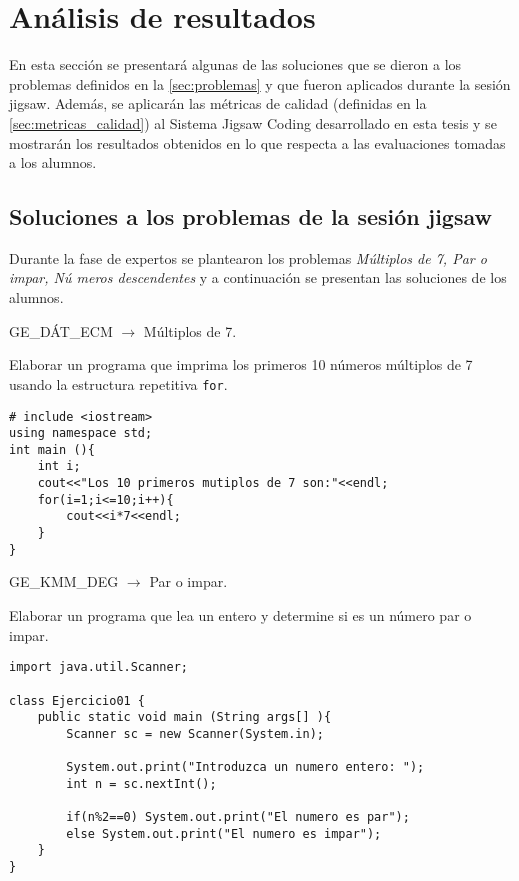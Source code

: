 \chapter{Análisis de resultados}
\label{cap:analisis_de_resultados}
En esta sección se presentará algunas de las soluciones que se dieron a los problemas definidos en la \autoref{sec:problemas} y que fueron aplicados durante la sesión jigsaw. Además, se aplicarán las métricas de calidad (definidas en la \autoref{sec:metricas_calidad}) al Sistema Jigsaw Coding desarrollado en esta tesis y se mostrarán los resultados obtenidos en lo que respecta a las evaluaciones tomadas a los alumnos.\\

\section{Soluciones a los problemas de la sesión jigsaw}
Durante la fase de expertos se plantearon los problemas \emph{Múltiplos de 7, Par o impar, Nú meros descendentes} y a continuación se presentan las soluciones de los alumnos.

\begin{center}
	GE\_DÁT\_ECM $\longrightarrow$ Múltiplos de 7.
\end{center}

Elaborar un programa que imprima los primeros 10 números múltiplos de 7 usando la estructura repetitiva \texttt{for}.

\lstset{language=C, breaklines=true, basicstyle=\footnotesize}
\begin{lstlisting}
# include <iostream>
using namespace std;
int main (){
	int i;
	cout<<"Los 10 primeros mutiplos de 7 son:"<<endl;
	for(i=1;i<=10;i++){
		cout<<i*7<<endl;
	}
}
\end{lstlisting}
\clearpage
\begin{center}
	GE\_KMM\_DEG $\longrightarrow$ Par o impar.
\end{center}

Elaborar un programa que lea un entero y determine si es un número par o impar.

\lstset{language=Java, breaklines=true, basicstyle=\footnotesize}
\begin{lstlisting}
import java.util.Scanner;

class Ejercicio01 {
	public static void main (String args[] ){
		Scanner sc = new Scanner(System.in);

		System.out.print("Introduzca un numero entero: ");
		int n = sc.nextInt();

		if(n%2==0) System.out.print("El numero es par");
		else System.out.print("El numero es impar");
	}
}
\end{lstlisting}

